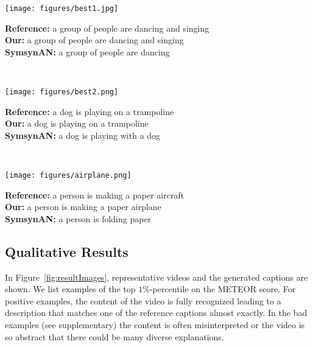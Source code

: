 \documentclass[runningheads,table]{llncs}
\begin{document}
\begin{figure*}[ht]
  { \centering
    \parbox{.90\linewidth}{
          \parbox{0.25\linewidth}{
    \texttt{[image: figures/best1.jpg]}} 
      \parbox{0.65\linewidth}{ 
      \scriptsize{\textbf{Reference:}
      a group of people are dancing and singing}\\
      \scriptsize{\textbf{Our:}
      a group of people are dancing and singing}\\
       \scriptsize{\textbf{SymsynAN:}
      a group of people are dancing}}}
      \\
      \parbox{.90\linewidth}{
    \parbox{0.25\linewidth}{
    \texttt{[image: figures/best2.png]} }
      \parbox{0.65\linewidth}{ 
      \scriptsize{\textbf{Reference:}
      a dog is playing on a trampoline}\\
      \scriptsize{\textbf{Our:}
     a dog is playing on a trampoline}\\
       \scriptsize{\textbf{SymsynAN:}
     a dog is playing with a dog}}}
   \\
    \parbox{.90\linewidth}{
        \parbox{0.25\linewidth}{
    \texttt{[image: figures/airplane.png]}} 
      \parbox{0.65\linewidth}{ 
      \scriptsize{\textbf{Reference:}
      a person is making a paper aircraft}\\
      \scriptsize{\textbf{Our:}
     a person is making a paper airplane}\\
       \scriptsize{\textbf{SymsynAN:}
     a person is folding paper}}}
    
   }
 \vspace{-0.3cm}

    






  
    \caption{Examples for the top-performing videos in the test set.}\label{fig:resultImages}
\end{figure*}

\subsection{Qualitative Results}\label{example_result}
\label{sec:exampleResults}
In Figure~\ref{fig:resultImages}, representative videos and the generated captions are shown. 
We list examples of the top $1\%$-percentile on the METEOR score.
For positive examples, the content of the video is fully recognized leading to a description that matches one of the reference captions almost exactly. In the bad examples (see supplementary) the content is often misinterpreted or the video is so abstract that there could be many diverse explanations. 
\end{document}
